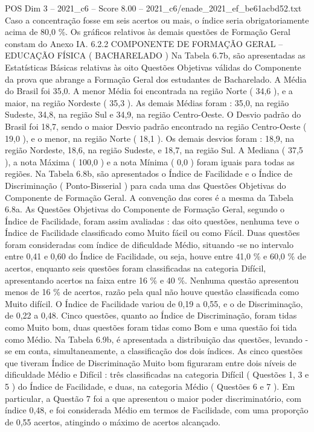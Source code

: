 \begin{textsample}{POS Dim 3 – 2021\_c6 – Score 8.00 – 2021\_c6/enade\_2021\_ef\_be61acbd52.txt}
Caso a concentração fosse em seis acertos ou mais, o índice seria obrigatoriamente acima de 80,0 \%.
Os gráficos relativos às demais questões de Formação Geral constam do Anexo IA. 6.2.2 COMPONENTE DE FORMAÇÃO GERAL – EDUCAÇÃO FÍSICA ( BACHARELADO ) Na Tabela 6.7b, são apresentadas as Estatísticas Básicas relativas às oito Questões Objetivas válidas do Componente da prova que abrange a Formação Geral dos estudantes de Bacharelado.
A Média do Brasil foi 35,0.
A menor Média foi encontrada na região Norte ( 34,6 ), e a maior, na região Nordeste ( 35,3 ).
As demais Médias foram : 35,0, na região Sudeste, 34,8, na região Sul e 34,9, na região Centro-Oeste.
O Desvio padrão do Brasil foi 18,7, sendo o maior Desvio padrão encontrado na região Centro-Oeste ( 19,0 ), e o menor, na região Norte ( 18,1 ).
Os demais desvios foram : 18,9, na região Nordeste, 18,6, na região Sudeste, e 18,7, na região Sul.
A Mediana ( 37,5 ), a nota Máxima ( 100,0 ) e a nota Mínima ( 0,0 ) foram iguais para todas as regiões.
Na Tabela 6.8b, são apresentados o Índice de Facilidade e o Índice de Discriminação ( Ponto-Bisserial ) para cada uma das Questões Objetivas do Componente de Formação Geral.
A convenção das cores é a mesma da Tabela 6.8a.
As Questões Objetivas do Componente de Formação Geral, segundo o Índice de Facilidade, foram assim avaliadas : das oito questões, nenhuma teve o Índice de Facilidade classificado como Muito fácil ou como Fácil.
Duas questões foram consideradas com índice de dificuldade Médio, situando -se no intervalo entre 0,41 e 0,60 do Índice de Facilidade, ou seja, houve entre 41,0 \% e 60,0 \% de acertos, enquanto seis questões foram classificadas na categoria Difícil, apresentando acertos na faixa entre 16 \% e 40 \%.
Nenhuma questão apresentou menos de 16 \% de acertos, razão pela qual não houve questão classificada como Muito difícil.
O Índice de Facilidade variou de 0,19 a 0,55, e o de Discriminação, de 0,22 a 0,48.
Cinco questões, quanto ao Índice de Discriminação, foram tidas como Muito bom, duas questões foram tidas como Bom e uma questão foi tida como Médio.
Na Tabela 6.9b, é apresentada a distribuição das questões, levando -se em conta, simultaneamente, a classificação dos dois índices.
As cinco questões que tiveram Índice de Discriminação Muito bom figuraram entre dois níveis de dificuldade Médio e Difícil : três classificadas na categoria Difícil ( Questões 1, 3 e 5 ) do Índice de Facilidade, e duas, na categoria Médio ( Questões 6 e 7 ).
Em particular, a Questão 7 foi a que apresentou o maior poder discriminatório, com índice 0,48, e foi considerada Médio em termos de Facilidade, com uma proporção de 0,55 acertos, atingindo o máximo de acertos alcançado.

\end{textsample}
